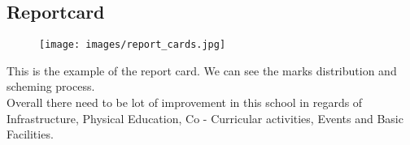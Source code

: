 \subsection{Reportcard}
\begin{figure}[H]
    \centering
    \texttt{[image: images/report\_cards.jpg]}
\end{figure} This is the example of the report card. We can see the marks distribution and scheming process. \\ 

Overall there need to be lot of improvement in this school in regards of Infrastructure, Physical Education, Co - Curricular activities, Events and Basic Facilities. 
